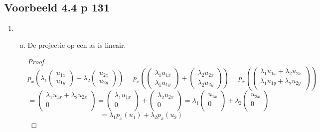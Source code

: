 \documentclass[lineaire_algebra_oplossingen.tex]{subfiles}
\begin{document}
\subsection{Voorbeeld 4.4 p 131}
\label{4.4}
\begin{enumerate}
\item
\begin{enumerate}[a)]
\item De projectie op een as is lineair.
\begin{proof}
\[
p_x \left(\lambda_1
\begin{pmatrix}
u_{1x}\\u_{1y}
\end{pmatrix} 
+ \lambda_2
\begin{pmatrix}
u_{2x}\\u_{2y}
\end{pmatrix} \right)
 = 
p_x \left(
\begin{pmatrix}
\lambda_1u_{1x}\\\lambda_1u_{1y}
\end{pmatrix} 
+ 
\begin{pmatrix}
\lambda_2u_{2x}\\\lambda_2u_{2y}
\end{pmatrix} \right)
=
p_x \left(
\begin{pmatrix}
\lambda_1u_{1x}+\lambda_2u_{2x}\\\lambda_1u_{1y}+\lambda_2u_{2y}\\
\end{pmatrix} \right)
\]
\[
= 
\begin{pmatrix}
\lambda_1u_{1x}+\lambda_2u_{2x}\\0\\
\end{pmatrix}
=
\begin{pmatrix}
\lambda_1u_{1x}\\0\\
\end{pmatrix}
+
\begin{pmatrix}
\lambda_2u_{2x}\\0\\
\end{pmatrix}
=
\lambda_1
\begin{pmatrix}
u_{1x}\\0\\
\end{pmatrix}
+
\lambda_2
\begin{pmatrix}
u_{2x}\\0\\
\end{pmatrix}
\]
\[
=
\lambda_1p_x(u_1) + \lambda_2p_x(u_2)
\]
\end{proof}


\end{enumerate}
\end{enumerate}
\end{document}
